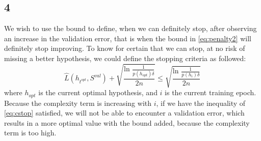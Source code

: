 \documentclass{article}
\begin{document}
\subsection{4}
We wish to use the bound to define, when we can definitely stop, after observing an increase in the validation error, that is when the bound in \eqref{eq:penalty2} will definitely stop improving. To know for certain that we can stop, at no risk of missing a better hypothesis, we could define the stopping criteria as followed:
\begin{equation}
\label{eq:cstop}
\hat{L}(h_{t^{opt}},S^{val}) + \sqrt{\dfrac{\text{ln } \frac{1}{p(h_{opt}) \delta}}{2n}} \leq \sqrt{\dfrac{\text{ln } \frac{1}{p(h_{i}) \delta}}{2n}}
\end{equation}
where $h_{opt}$ is the current optimal hypothesis, and $i$ is the current training epoch. Because the complexity term is increasing with $i$, if we have the inequality of \eqref{eq:cstop} satisfied, we will not be able to encounter a validation error, which results in a more optimal value with the bound added, because the complexity term is too high.
\end{document}
